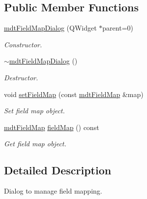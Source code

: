 \subsection*{Public Member Functions}
\begin{DoxyCompactItemize}
\item 
\hypertarget{classmdt_field_map_dialog_acce6b6c80a9bc8733af375f2c8e72e55}{
\hyperlink{classmdt_field_map_dialog_acce6b6c80a9bc8733af375f2c8e72e55}{mdtFieldMapDialog} (QWidget $\ast$parent=0)}
\label{classmdt_field_map_dialog_acce6b6c80a9bc8733af375f2c8e72e55}

\begin{DoxyCompactList}\small\item\em Constructor. \end{DoxyCompactList}\item 
\hypertarget{classmdt_field_map_dialog_a17d933efc62d5d4e5b5753a1369b4e49}{
\hyperlink{classmdt_field_map_dialog_a17d933efc62d5d4e5b5753a1369b4e49}{$\sim$mdtFieldMapDialog} ()}
\label{classmdt_field_map_dialog_a17d933efc62d5d4e5b5753a1369b4e49}

\begin{DoxyCompactList}\small\item\em Destructor. \end{DoxyCompactList}\item 
void \hyperlink{classmdt_field_map_dialog_a1eabc6cab0fad59eb2a6469fcf493a92}{setFieldMap} (const \hyperlink{classmdt_field_map}{mdtFieldMap} \&map)
\begin{DoxyCompactList}\small\item\em Set field map object. \end{DoxyCompactList}\item 
\hypertarget{classmdt_field_map_dialog_ac1348e93dc0c7f2f0fb27a8c5724376c}{
\hyperlink{classmdt_field_map}{mdtFieldMap} \hyperlink{classmdt_field_map_dialog_ac1348e93dc0c7f2f0fb27a8c5724376c}{fieldMap} () const }
\label{classmdt_field_map_dialog_ac1348e93dc0c7f2f0fb27a8c5724376c}

\begin{DoxyCompactList}\small\item\em Get field map object. \end{DoxyCompactList}\end{DoxyCompactItemize}


\subsection{Detailed Description}
Dialog to manage field mapping. 

